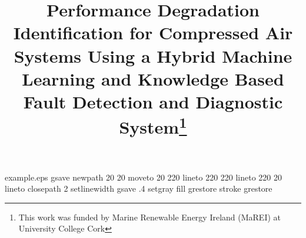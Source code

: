 %
%
%
%
%
\begin{filecontents*}{example.eps}
gsave
newpath
  20 20 moveto
  20 220 lineto
  220 220 lineto
  220 20 lineto
closepath
2 setlinewidth
gsave
  .4 setgray fill
grestore
stroke
grestore
\end{filecontents*}
%
\RequirePackage{fix-cm}
%
\documentclass[natbib]{svjour3}                     %
%
\smartqed  %
%
\usepackage{graphicx}
%
\usepackage{mathptmx}      %
%
%
\usepackage{hyperref}



\usepackage{booktabs}
\usepackage{multirow}
\usepackage{tabularx}
\usepackage{longtable}
\usepackage{lipsum}
\usepackage{lscape}
\usepackage{siunitx}
\usepackage{amsmath}
\usepackage{rotating}
%
%


\title{Performance Degradation Identification for Compressed Air Systems Using a Hybrid Machine Learning and Knowledge Based Fault Detection and Diagnostic System\thanks{This work was funded by Marine Renewable Energy Ireland (MaREI) at University College Cork}
}

